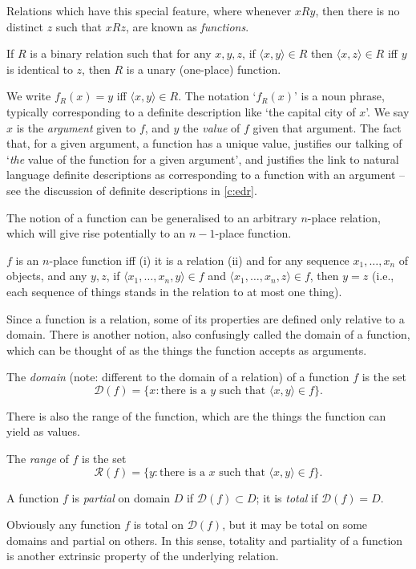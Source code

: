 Relations which have this special feature, where whenever $xRy$, then there is no distinct $z$ such that $xRz$, are known as \emph{functions}. 
\begin{definition}
  If $R$ is a binary relation such that for any $x,y,z$, if $\langle x,y\rangle\in R$ then $\langle x,z\rangle\in R$ iff $y$ is identical to $z$, then $R$ is a unary (one-place) function. 
\end{definition}
We write $f_{R}(x) =y$ iff $\langle x,y\rangle\in R$. The notation `$f_{R}(x)$' is a noun phrase, typically corresponding to a definite description like `the capital city of $x$'. We say $x$ is the \emph{argument} given to $f$, and $y$ the \emph{value} of $f$ given that argument.  The fact that, for a given argument, a function has a unique value, justifies our talking of `\emph{the} value of the function for a given argument', and justifies the link to natural language definite descriptions as corresponding to a function with an argument – see the discussion of definite descriptions in \autoref{c:edr}. 

The notion of a function can be generalised to an arbitrary $n$-place relation, which will give rise potentially to an $n-1$-place function.
\begin{definition}[Function]
	$f$ is an $n$-place function iff (i) it is a relation (ii) and for any sequence $x_{1},\ldots,x_{n}$ of objects, and any $y,z$, if $\langle x_{1},\ldots,x_{n},y\rangle \in f$ and $\langle x_{1},\ldots,x_{n},z\rangle \in f$, then $y=z$ (i.e., each sequence of things stands in the relation to at most one thing). 
\end{definition}

Since a function is a relation, some of its properties are defined only relative to a domain. There is another notion, also confusingly called the domain of a function, which can be thought of as the things the function accepts as arguments.
\begin{definition}[Domain]
The \emph{domain} (note: different to the domain of a relation) of a function  $f$ is the set $$\mathcal{D}(f)=\{x: \text{there is a $y$ such that } \langle x,y \rangle \in f\}.$$
\end{definition} There is also the range of the function, which are the things the function can yield as values.
\begin{definition}[Range]
	The \emph{range} of $f$ is the set $$\mathcal{R}(f)=\{y: \text{there is a $x$ such that } \langle x,y \rangle \in f\}.$$
\end{definition}
\begin{definition}
	A function $f$ is \emph{partial}  on domain $D$ if $\mathcal{D}(f) \subset D$; it is \emph{total} if $\mathcal{D}(f) =D$.
\end{definition} Obviously any function $f$ is total on $\mathscr{D}(f)$, but it may be total on some domains and partial on others. In this sense, totality and partiality of a function is another extrinsic property of the underlying relation.

